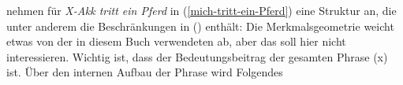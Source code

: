 \citet[]{RS2009a} nehmen für  \emph{X-Akk tritt ein Pferd} in (\ref{mich-tritt-ein-Pferd})
eine Struktur an, die unter anderem die Beschränkungen in () enthält:
\ea
\z
Die Merkmalsgeometrie weicht etwas von der in diesem Buch verwendeten ab, aber das
soll hier nicht interessieren. Wichtig ist, dass der Bedeutungsbeitrag der gesamten
Phrase (x) ist. Über den internen Aufbau der Phrase wird Folgendes
